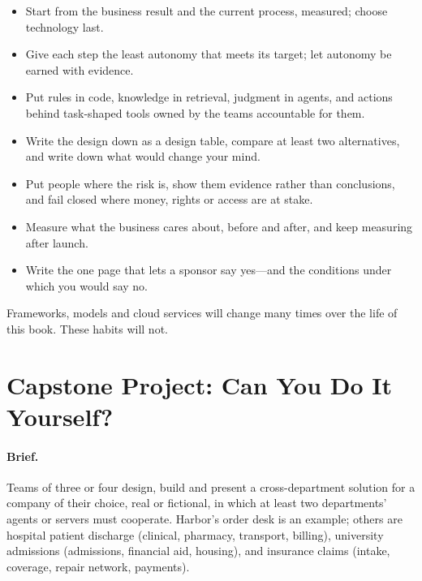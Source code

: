 \begin{keyidea}
\begin{itemize}[leftmargin=*,itemsep=2pt]
  \item Start from the business result and the current process, measured; choose technology last.
  \item Give each step the least autonomy that meets its target; let autonomy be earned with evidence.
  \item Put rules in code, knowledge in retrieval, judgment in agents, and actions behind task-shaped tools owned by the teams accountable for them.
  \item Write the design down as a design table, compare at least two alternatives, and write down what would change your mind.
  \item Put people where the risk is, show them evidence rather than conclusions, and fail closed where money, rights or access are at stake.
  \item Measure what the business cares about, before and after, and keep measuring after launch.
  \item Write the one page that lets a sponsor say yes---and the conditions under which you would say no.
\end{itemize}
\end{keyidea}
Frameworks, models and cloud services will change many times over the life of this book. These habits will not.

\section{Capstone Project: Can You Do It Yourself?}
\label{sec:cap-project}

\paragraph{Brief.} Teams of three or four design, build and present a cross-department solution for a company of their choice, real or fictional, in which at least two departments' agents or servers must cooperate. Harbor's order desk is an example; others are hospital patient discharge (clinical, pharmacy, transport, billing), university admissions (admissions, financial aid, housing), and insurance claims (intake, coverage, repair network, payments).

